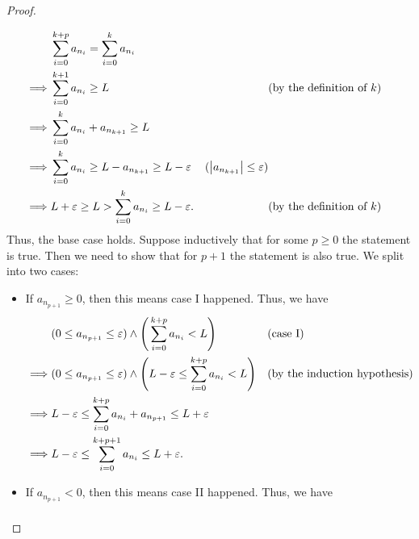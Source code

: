 \begin{proof}
\begin{itemize}
\begin{align*}
                     & \sum_{i = 0}^{k + p} a_{n_i} = \sum_{i = 0}^k a_{n_i}                                                                                                \\
            \implies & \sum_{i = 0}^{k + 1} a_{n_i} \geq L                                   &                                        & \text{(by the definition of \(k\))} \\
            \implies & \sum_{i = 0}^k a_{n_i} + a_{n_{k + 1}} \geq L                                                                                                        \\
            \implies & \sum_{i = 0}^k a_{n_i} \geq L - a_{n_{k + 1}} \geq L - \varepsilon    & (\left\lvert a_{n_{k + 1}}\right\rvert \leq \varepsilon)                                       \\
            \implies & L + \varepsilon \geq L > \sum_{i = 0}^k a_{n_i} \geq L - \varepsilon. &                                        & \text{(by the definition of \(k\))}
          \end{align*}
          Thus, the base case holds.
          Suppose inductively that for some \(p \geq 0\) the statement is true.
          Then we need to show that for \(p + 1\) the statement is also true.
          We split into two cases:
          \begin{itemize}
            \item If \(a_{n_{p + 1}} \geq 0\), then this means case I happened.
                  Thus, we have
                  \begin{align*}
                             & (0 \leq a_{n_{p + 1}} \leq \varepsilon) \land \Bigg(\sum_{i = 0}^{k + p} a_{n_i} < L\Bigg)                      &  & \text{(case I)} \\
                    \implies & (0 \leq a_{n_{p + 1}} \leq \varepsilon) \land \Bigg(L - \varepsilon \leq \sum_{i = 0}^{k + p} a_{n_i} < L\Bigg) &  & \text{(by the induction hypothesis)}           \\
                    \implies & L - \varepsilon \leq \sum_{i = 0}^{k + p} a_{n_i} + a_{n_{p + 1}} \leq L + \varepsilon                                               \\
                    \implies & L - \varepsilon \leq \sum_{i = 0}^{k + p + 1} a_{n_i} \leq L + \varepsilon.
                  \end{align*}
            \item If \(a_{n_{p + 1}} < 0\), then this means case II happened.
                  Thus, we have
                  \begin{align*}

\end{align*}
\end{itemize}
\end{itemize}
\end{proof}
